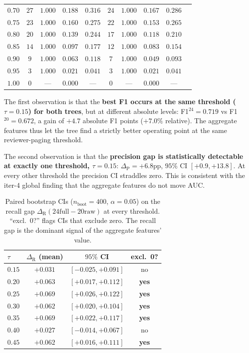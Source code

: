 \begin{table}[t]
\begin{tabular}{lccccccccc}
$0.70$ & $27$ & $1.000$ & $0.188$ & $0.316$ & $24$ & $1.000$ & $0.167$ & $0.286$ \\
$0.75$ & $23$ & $1.000$ & $0.160$ & $0.275$ & $22$ & $1.000$ & $0.153$ & $0.265$ \\
$0.80$ & $20$ & $1.000$ & $0.139$ & $0.244$ & $17$ & $1.000$ & $0.118$ & $0.210$ \\
$0.85$ & $14$ & $1.000$ & $0.097$ & $0.177$ & $12$ & $1.000$ & $0.083$ & $0.154$ \\
$0.90$ & $9$ & $1.000$ & $0.063$ & $0.118$ & $7$ & $1.000$ & $0.049$ & $0.093$ \\
$0.95$ & $3$ & $1.000$ & $0.021$ & $0.041$ & $3$ & $1.000$ & $0.021$ & $0.041$ \\
$1.00$ & $0$ & --- & $0.000$ & --- & $0$ & --- & $0.000$ & --- \\
\bottomrule
\end{tabular}
\end{table}

The first observation is that the \textbf{best F1 occurs at the same
threshold ($\tau = 0.15$) for both trees}, but at different absolute
levels: F1$^\text{24} = 0.719$ vs F1$^\text{20} = 0.672$, a gain of
$+4.7$ absolute F1 points ($+7.0\%$ relative). The aggregate features
thus let the tree find a strictly better operating point at the same
reviewer-paging threshold.

The second observation is that the \textbf{precision gap is statistically
detectable at exactly one threshold, $\tau = 0.15$}: $\Delta_\text{P} =
+6.8$pp, $95\%$ CI $[+0.9, +13.8]$. At every other threshold the
precision CI straddles zero. This is consistent with the iter-4 global
finding that the aggregate features do not move AUC.

\begin{table}[t]
\centering
\small
\caption{Paired bootstrap CIs ($n_\text{boot}{=}400$, $\alpha{=}0.05$)
on the recall gap $\Delta_\text{R}(\text{24full}{-}\text{20raw})$ at
every threshold. ``excl.\ 0?'' flags CIs that exclude zero. The recall
gap is the dominant signal of the aggregate features' value.}
\label{tab:p8-evidence-threshold-recall-boot}
\begin{tabular}{lccc}
\toprule
$\tau$ & $\Delta_\text{R}$ (mean) & $95\%$ CI & excl.\ 0? \\
\midrule
$0.15$ & $+0.031$ & $[-0.025, +0.091]$ & no \\
$\mathbf{0.20}$ & $\mathbf{+0.063}$ & $\mathbf{[+0.017, +0.112]}$ & \textbf{yes} \\
$\mathbf{0.25}$ & $\mathbf{+0.069}$ & $\mathbf{[+0.026, +0.122]}$ & \textbf{yes} \\
$\mathbf{0.30}$ & $\mathbf{+0.062}$ & $\mathbf{[+0.020, +0.104]}$ & \textbf{yes} \\
$\mathbf{0.35}$ & $\mathbf{+0.069}$ & $\mathbf{[+0.022, +0.117]}$ & \textbf{yes} \\
$0.40$ & $+0.027$ & $[-0.014, +0.067]$ & no \\
$\mathbf{0.45}$ & $\mathbf{+0.062}$ & $\mathbf{[+0.016, +0.111]}$ & \textbf{yes} \\
\bottomrule
\end{tabular}
\end{table}

